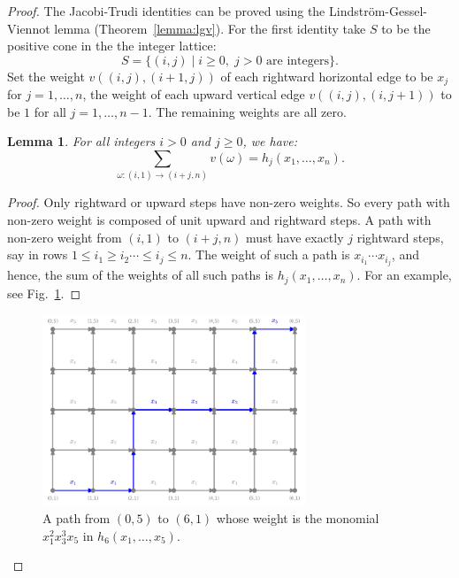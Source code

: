 \documentclass[11pt]{amsproc}
\newtheorem{lemma}[theorem]{Lemma}
\theoremstyle{definition}
\theoremstyle{example}
\begin{document}
\begin{proof}
  The Jacobi-Trudi identities can be proved using the Lindstr\"om-Gessel-Viennot lemma (Theorem~\ref{lemma:lgv}).
  For the first identity take $S$ to be the positive cone in the the integer lattice:
  \begin{displaymath}
    S = \{(i,j)\mid i\geq 0,\; j>0 \text{ are integers}\}.
  \end{displaymath}
  Set the weight $v((i,j), (i+1,j))$ of each rightward horizontal edge to be $x_j$ for $j=1,\dotsc, n$, the weight of each upward vertical edge $v((i,j), (i,j+1))$ to be $1$ for all $j=1,\dotsc,n-1$.
  The remaining weights are all zero.
  \begin{lemma}
    \label{lemma:entry}
    For all integers $i>0$ and $j\geq 0$, we have:
    \begin{displaymath}
      \sum_{\omega:(i, 1)\to (i+j, n)} v(\omega) = h_j(x_1,\dotsc,x_n).
    \end{displaymath}
  \end{lemma}
  \begin{proof}
    Only rightward or upward steps have non-zero weights.
    So every path with non-zero weight is composed of unit upward and rightward steps.
    A path with non-zero weight from $(i, 1)$ to $(i+j, n)$ must have exactly $j$ rightward steps, say in rows $1\leq i_1\geq i_2 \dotsb \leq i_j\leq n$.
    The weight of such a path is $x_{i_1}\dotsb x_{i_j}$, and hence, the sum of the weights of all such paths is $h_j(x_1,\dotsc, x_n)$. For an example, see Fig.~\ref{fig:path_example}.
  \end{proof}
  \begin{figure}
    \centering
    \includegraphics[width=0.7\textwidth]{path_example.png}
    \caption{A path from $(0, 5)$ to $(6, 1)$ whose weight is the monomial $x_1^2x_3^3x_5$ in $h_6(x_1,\dotsc,x_5)$.}
    \label{fig:path_example}
  \end{figure}

\end{proof}
\end{document}
